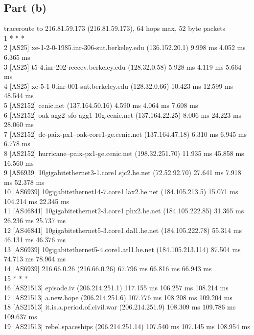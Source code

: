 \documentclass[11pt]{article}
\begin{document}
\subsection*{Part (b)}
traceroute to 216.81.59.173 (216.81.59.173), 64 hops max, 52 byte packets\\
 1  * * *\\
 2  [AS25] xe-1-2-0-1985.inr-306-sut.berkeley.edu (136.152.20.1)  9.998 ms  4.052 ms  6.365 ms\\
 3  [AS25] t5-4.inr-202-reccev.berkeley.edu (128.32.0.58)  5.928 ms  4.119 ms  5.664 ms\\
 4  [AS25] xe-5-1-0.inr-001-sut.berkeley.edu (128.32.0.66)  10.423 ms  12.599 ms  48.544 ms\\
 5  [AS2152] cenic.net (137.164.50.16)  4.590 ms  4.064 ms  7.608 ms\\
 6  [AS2152] oak-agg2--sfo-agg1-10g.cenic.net (137.164.22.25)  8.006 ms  24.223 ms  28.060 ms\\
 7  [AS2152] dc-paix-px1--oak-core1-ge.cenic.net (137.164.47.18)  6.310 ms  6.945 ms  6.778 ms\\
 8  [AS2152] hurricane--paix-px1-ge.cenic.net (198.32.251.70)  11.935 ms  45.858 ms  16.560 ms\\
 9  [AS6939] 10gigabitethernet3-1.core1.sjc2.he.net (72.52.92.70)  27.641 ms  7.918 ms  52.378 ms\\
10  [AS6939] 10gigabitethernet14-7.core1.lax2.he.net (184.105.213.5)  15.071 ms  104.214 ms  22.345 ms\\
11  [AS46841] 10gigabitethernet2-3.core1.phx2.he.net (184.105.222.85)  31.365 ms  26.236 ms  25.737 ms\\
12  [AS46841] 10gigabitethernet5-3.core1.dal1.he.net (184.105.222.78)  55.314 ms  46.131 ms  46.376 ms\\
13  [AS6939] 10gigabitethernet5-4.core1.atl1.he.net (184.105.213.114)  87.504 ms  74.713 ms  78.964 ms\\
14  [AS6939] 216.66.0.26 (216.66.0.26)  67.796 ms  66.816 ms  66.943 ms\\
15  * * *\\
16  [AS21513] episode.iv (206.214.251.1)  117.155 ms  106.257 ms  108.214 ms\\
17  [AS21513] a.new.hope (206.214.251.6)  107.776 ms  108.208 ms  109.204 ms\\
18  [AS21513] it.is.a.period.of.civil.war (206.214.251.9)  108.309 ms  109.786 ms  109.637 ms\\
19  [AS21513] rebel.spaceships (206.214.251.14)  107.540 ms  107.145 ms  108.954 ms\\
\end{document}
